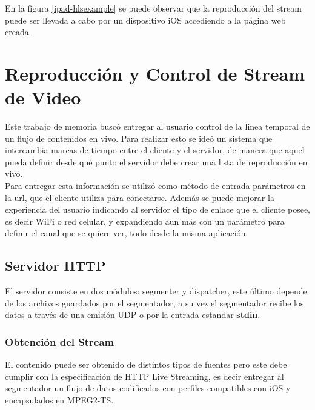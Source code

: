 En la figura \ref{ipad-hlsexample} se puede observar que la reproducción del stream puede ser llevada a cabo por un dispositivo iOS accediendo a la página web creada.\\








	
	
\section{Reproducción y Control de Stream de Video}

	Este trabajo de memoria buscó entregar al usuario control de la linea temporal de un flujo de contenidos en vivo. Para realizar esto se ideó un sistema que intercambia marcas de tiempo entre el cliente y el servidor, de manera que aquel pueda definir desde qué punto el servidor debe crear una lista de reproducción en vivo. \\
	
	Para entregar esta información se utilizó como método de entrada parámetros en la url, que el cliente utiliza para conectarse. Además se puede mejorar la experiencia del usuario indicando al servidor el tipo de enlace que el cliente posee, es decir WiFi o red celular, y expandiendo aun más con un parámetro para definir el canal que se quiere ver, todo desde la misma aplicación.
	
	\subsection{Servidor HTTP}
	El servidor consiste en dos módulos: segmenter y dispatcher, este último depende de los archivos guardados por el segmentador, a su vez el segmentador recibe los datos a través de una emisión UDP o por la entrada estandar \textbf{stdin}.
		\subsubsection{Obtención del Stream}
El contenido puede ser obtenido de distintos tipos de fuentes pero este debe cumplir con la especificación de HTTP Live Streaming, es decir entregar al segmentador un flujo de datos codificados con perfiles compatibles con iOS y encapsulados en MPEG2-TS.
